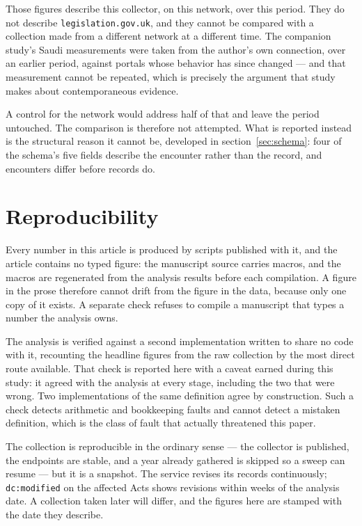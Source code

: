\documentclass[11pt]{article}
\begin{document}
Those figures describe this collector, on this network, over this period. They
do not describe \texttt{legislation.gov.uk}, and they cannot be compared with a
collection made from a different network at a different time. The companion
study's Saudi measurements were taken from the author's own connection, over an
earlier period, against portals whose behavior has since changed --- and that
measurement cannot be repeated, which is precisely the argument that study
makes about contemporaneous evidence.

A control for the network would address half of that and leave the period
untouched. The comparison is therefore not attempted. What is reported instead
is the structural reason it cannot be, developed in
section~\ref{sec:schema}: four of the schema's five fields describe the
encounter rather than the record, and encounters differ before records do.

\section{Reproducibility}

Every number in this article is produced by scripts published with it, and the
article contains no typed figure: the manuscript source carries macros, and the
macros are regenerated from the analysis results before each compilation. A
figure in the prose therefore cannot drift from the figure in the data, because
only one copy of it exists. A separate check refuses to compile a manuscript
that types a number the analysis owns.

The analysis is verified against a second implementation written to share no
code with it, recounting the headline figures from the raw collection by the
most direct route available. That check is reported here with a caveat earned
during this study: it agreed with the analysis at every stage, including the
two that were wrong. Two implementations of the same definition agree by
construction. Such a check detects arithmetic and bookkeeping faults and cannot
detect a mistaken definition, which is the class of fault that actually
threatened this paper.

The collection is reproducible in the ordinary sense --- the collector is
published, the endpoints are stable, and a year already gathered is skipped so
a sweep can resume --- but it is a snapshot. The service revises its records
continuously; \texttt{dc:modified} on the affected Acts shows revisions within
weeks of the analysis date. A collection taken later will differ, and the
figures here are stamped with the date they describe.
\end{document}
